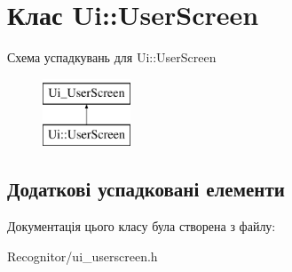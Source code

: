 \hypertarget{classUi_1_1UserScreen}{\section{Клас Ui\-:\-:User\-Screen}
\label{classUi_1_1UserScreen}
}
Схема успадкувань для Ui\-:\-:User\-Screen\begin{figure}[H]
\begin{center}
\leavevmode
\includegraphics[height=2.000000cm]{classUi_1_1UserScreen}
\end{center}
\end{figure}
\subsection*{Додаткові успадковані елементи}


Документація цього класу була створена з файлу\-:\begin{DoxyCompactItemize}
\item 
Recognitor/ui\-\_\-userscreen.\-h\end{DoxyCompactItemize}
